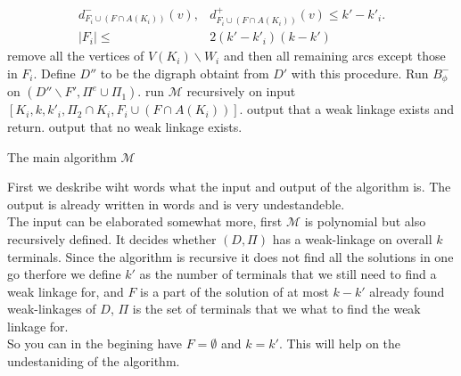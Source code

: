 \begin{algorithm}
\begin{algorithmic}[1]
{                \begin{align}
                    d^-_{F_i\cup(F\cap A(K_i))}(v),&d^+_{F_i\cup(F\cap A(K_i))}(v)\leq k'-k'_i.\\
                    |F_i|\leq &2(k'-k'_i)(k-k')
                \end{align}
                }
                        \STATE remove all the vertices of $V(K_i)\backslash W_i$ and then all remaining arcs except those in $F_i$.
                    \ENDFOR
                    \STATE Define $D''$ to be the digraph obtaint from $D'$ with this procedure.
                    \STATE Run $B_{\phi}^-$ on $(D''\backslash F',\Pi^e\cup\Pi_1)$.
                        \STATE run $\mathcal{M}$ recursively on input $[K_i,k,k'_i,\Pi_2\cap K_i,F_i\cup(F\cap A(K_i))]$.
                    \ENDFOR 
                \ENDFOR
            \ENDIF
                \STATE output that a weak linkage exists and return.
            \ENDIF
        \ENDFOR 
            \STATE output that no weak linkage exists.
        \ENDIF
    \end{algorithmic}
    \caption{The main algorithm $\mathcal{M}$}
\end{algorithm}


 

    First we deskribe wiht words what the input and output of the algorithm is. 
    The output is already written in words and is very undestandeble. \\
    The input can be elaborated somewhat more, first $\mathcal{M}$ is polynomial but also recursively defined. 
    It decides whether $(D,\Pi)$  has a weak-linkage on overall $k$ terminals. 
    Since the algorithm is recursive it does not find all the solutions in one go therfore we define $k'$ as the number of terminals that we still need to find a weak linkage for, and $F$ is a part of the solution of at most $k-k'$ already found weak-linkages of $D$, $\Pi$ is the set of terminals that we what to find the weak linkage for. \\
    So you can in the begining have $F=\emptyset$ and $k=k'$. This will help on the undestaniding of the algorithm.    
 
